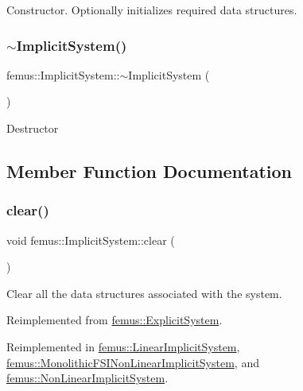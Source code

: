 Constructor. Optionally initializes required data structures. \mbox{\label{classfemus_1_1_implicit_system_a97fac2422cf7b0c95b38e2ff00dbf708}} 
\subsubsection{\texorpdfstring{$\sim$\+Implicit\+System()}{~ImplicitSystem()}}
{\footnotesize\ttfamily femus\+::\+Implicit\+System\+::$\sim$\+Implicit\+System (\begin{DoxyParamCaption}{ }\end{DoxyParamCaption})\hspace{0.3cm}{\ttfamily [virtual]}}

Destructor 

\subsection{Member Function Documentation}
\mbox{\label{classfemus_1_1_implicit_system_a0d5395e6a8de6625f9059384b990f83f}} 
\subsubsection{\texorpdfstring{clear()}{clear()}}
{\footnotesize\ttfamily void femus\+::\+Implicit\+System\+::clear (\begin{DoxyParamCaption}{ }\end{DoxyParamCaption})\hspace{0.3cm}{\ttfamily [virtual]}}

Clear all the data structures associated with the system. 

Reimplemented from \mbox{\hyperlink{classfemus_1_1_explicit_system_ac078fbc3f758429e8a60dac487aab5ce}{femus\+::\+Explicit\+System}}.



Reimplemented in \mbox{\hyperlink{classfemus_1_1_linear_implicit_system_ace039665432e53db0c25b0efede44a76}{femus\+::\+Linear\+Implicit\+System}}, \mbox{\hyperlink{classfemus_1_1_monolithic_f_s_i_non_linear_implicit_system_ac7f2bedf4d1c6b00f5443cb5128a3069}{femus\+::\+Monolithic\+F\+S\+I\+Non\+Linear\+Implicit\+System}}, and \mbox{\hyperlink{classfemus_1_1_non_linear_implicit_system_afc52f569e5be8c3bf593a00c883d7192}{femus\+::\+Non\+Linear\+Implicit\+System}}.

